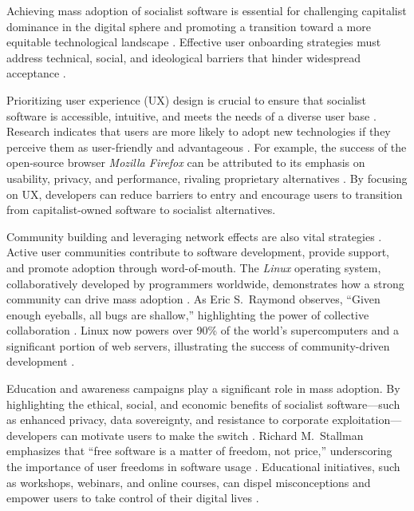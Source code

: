 \begin{refsection}
Achieving mass adoption of socialist software is essential for challenging capitalist dominance in the digital sphere and promoting a transition toward a more equitable technological landscape \cite[pp.~221--224]{Rogers2003}. Effective user onboarding strategies must address technical, social, and ideological barriers that hinder widespread acceptance \cite[pp.~5--7]{Fuchs2020}.

Prioritizing user experience (UX) design is crucial to ensure that socialist software is accessible, intuitive, and meets the needs of a diverse user base \cite[pp.~5--6]{Norman2013}. Research indicates that users are more likely to adopt new technologies if they perceive them as user-friendly and advantageous \cite[pp.~16--22]{Rogers2003}. For example, the success of the open-source browser \textit{Mozilla Firefox} can be attributed to its emphasis on usability, privacy, and performance, rivaling proprietary alternatives \cite{Mozilla2021}. By focusing on UX, developers can reduce barriers to entry and encourage users to transition from capitalist-owned software to socialist alternatives.

Community building and leveraging network effects are also vital strategies \cite[pp.~49--54]{Shirky2008}. Active user communities contribute to software development, provide support, and promote adoption through word-of-mouth. The \textit{Linux} operating system, collaboratively developed by programmers worldwide, demonstrates how a strong community can drive mass adoption \cite[pp.~21--30]{Raymond2001}. As Eric S.~Raymond observes, ``Given enough eyeballs, all bugs are shallow,'' highlighting the power of collective collaboration \cite[pp.~30]{Raymond2001}. Linux now powers over 90\% of the world's supercomputers and a significant portion of web servers, illustrating the success of community-driven development \cite{LinuxFoundation2020}.

Education and awareness campaigns play a significant role in mass adoption. By highlighting the ethical, social, and economic benefits of socialist software—such as enhanced privacy, data sovereignty, and resistance to corporate exploitation—developers can motivate users to make the switch \cite[pp.~27--31]{Stallman2010}. Richard M.~Stallman emphasizes that ``free software is a matter of freedom, not price,'' underscoring the importance of user freedoms in software usage \cite[pp.~3]{Stallman2010}. Educational initiatives, such as workshops, webinars, and online courses, can dispel misconceptions and empower users to take control of their digital lives \cite[pp.~67--69]{Freire2018}.


\end{refsection}
